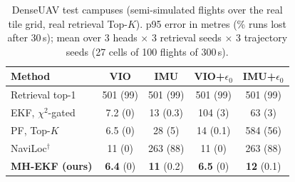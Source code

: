 \begin{table}[t]
\centering
\caption{DenseUAV test campuses (semi-simulated flights over the real tile grid, real retrieval Top-$K$). p95 error in metres (\% runs lost after 30\,s); mean over 3 heads $\times$ 3 retrieval seeds $\times$ 3 trajectory seeds (27 cells of 100 flights of 300\,s).}
\label{tab:dense}
\setlength{\tabcolsep}{3.5pt}
\small
\begin{tabular}{lcccc}
\toprule
Method & VIO & IMU & VIO+$\epsilon_0$ & IMU+$\epsilon_0$ \\
\midrule
Retrieval top-1 & 501 (99) & 501 (99) & 501 (99) & 501 (99) \\
EKF, $\chi^2$-gated & 7.2 (0) & 13 (0.3) & 104 (3) & 63 (3) \\
PF, Top-$K$ & 6.5 (0) & 28 (5) & 14 (0.1) & 584 (56) \\
NaviLoc$^\dagger$ \cite{shpagin2026naviloc} & 11 (0) & 263 (88) & 11 (0) & 263 (88) \\
\textbf{MH-EKF (ours)} & \textbf{6.4} (0) & \textbf{11} (0.2) & \textbf{6.5} (0) & \textbf{12} (0.1) \\
\bottomrule
\end{tabular}
\end{table}
